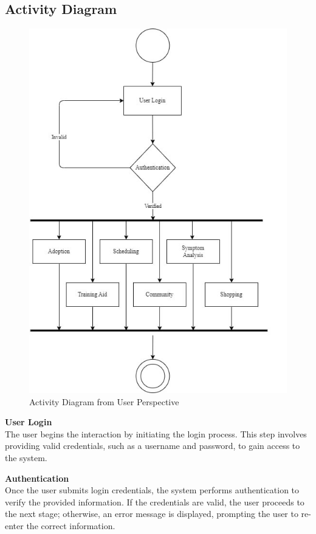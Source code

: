 \subsection{Activity Diagram}
\vspace{2cm}
\begin{figure}[H]
\centering
\includegraphics[width=0.9\linewidth]{img/activityU.jpg}
\caption[Activity Diagram from User Perspective]{Activity Diagram from User Perspective}
\label{fig:activity-User}
\end{figure}
\newpage

\noindent\textbf{User Login}\\ The user begins the interaction by initiating the login process. This step involves providing valid credentials, such as a username and password, to gain access to the system.

\noindent\textbf{Authentication}\\Once the user submits login credentials, the system performs authentication to verify the provided information. If the credentials are valid, the user proceeds to the next stage; otherwise, an error message is displayed, prompting the user to re-enter the correct information.

